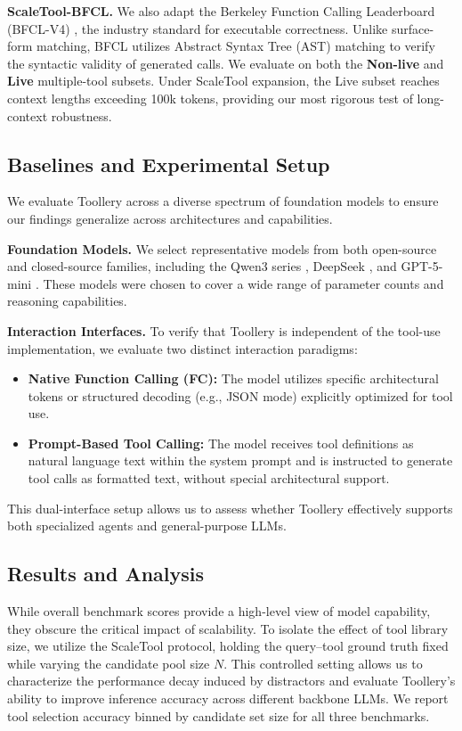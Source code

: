 \documentclass[11pt]{article}
\begin{document}
\textbf{ScaleTool-BFCL.} We also adapt the Berkeley Function Calling Leaderboard (BFCL-V4) \cite{patilberkeley}, the industry standard for executable correctness. Unlike surface-form matching, BFCL utilizes Abstract Syntax Tree (AST) matching to verify the syntactic validity of generated calls. We evaluate on both the \textbf{Non-live} and \textbf{Live} multiple-tool subsets. Under ScaleTool expansion, the Live subset reaches context lengths exceeding 100k tokens, providing our most rigorous test of long-context robustness.



\subsection{Baselines and Experimental Setup}
We evaluate Toollery across a diverse spectrum of foundation models to ensure our findings generalize across architectures and capabilities.

\textbf{Foundation Models.} We select representative models from both open-source and closed-source families, including the Qwen3 series \cite{yang2025qwen3}, DeepSeek \cite{liu2025deepseek}, and GPT-5-mini \cite{gpt5}. These models were chosen to cover a wide range of parameter counts and reasoning capabilities.

\textbf{Interaction Interfaces.} To verify that Toollery is independent of the tool-use implementation, we evaluate two distinct interaction paradigms:
\begin{itemize}
    \item \textbf{Native Function Calling (FC):} The model utilizes specific architectural tokens or structured decoding (e.g., JSON mode) explicitly optimized for tool use.
    \item \textbf{Prompt-Based Tool Calling:} The model receives tool definitions as natural language text within the system prompt and is instructed to generate tool calls as formatted text, without special architectural support.
\end{itemize}
This dual-interface setup allows us to assess whether Toollery effectively supports both specialized agents and general-purpose LLMs.



\subsection{Results and Analysis}
While overall benchmark scores provide a high-level view of model capability, they obscure the critical impact of scalability. To isolate the effect of tool library size, we utilize the ScaleTool protocol, holding the query--tool ground truth fixed while varying the candidate pool size $N$. This controlled setting allows us to characterize the performance decay induced by distractors and evaluate Toollery's ability to improve inference accuracy across different backbone LLMs. We report tool selection accuracy binned by candidate set size for all three benchmarks.
\end{document}
